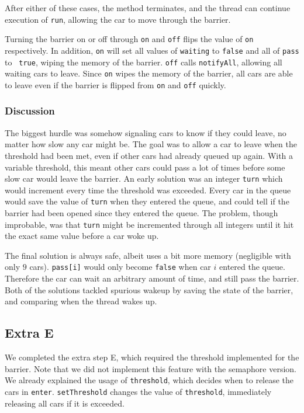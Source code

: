 After either of these cases, the method terminates, and the thread can continue execution of \texttt{run}, allowing the car to move through the barrier.

Turning the barrier on or off through \texttt{on} and \texttt{off} flips the value of \texttt{on} respectively. In addition, \texttt{on} will set all values of \texttt{waiting} to \texttt{false} and all of \texttt{pass} to \texttt{ true}, wiping the memory of the barrier. \texttt{off} calls \texttt{notifyAll}, allowing all waiting cars to leave. Since \texttt{on} wipes the memory of the barrier, all cars are able to leave even if the barrier is flipped from \texttt{on} and \texttt{off} quickly.

\subsubsection{Discussion}
The biggest hurdle was somehow signaling cars to know if they could leave, no matter how slow any car might be. The goal was to allow a car to leave when the threshold had been met, even if other cars had already queued up again. With a variable threshold, this meant other cars could pass a lot of times before some slow car would leave the barrier. An early solution was an integer \texttt{turn} which would increment every time the threshold was exceeded. Every car in the queue would save the value of \texttt{turn} when they entered the queue, and could tell if the barrier had been opened since they entered the queue. The problem, though improbable, was that \texttt{turn} might be incremented through all integers until it hit the exact same value before a car woke up.

The final solution is always safe, albeit uses a bit more memory (negligible with only $9$ cars). \texttt{pass[i]} would only become \texttt{false} when car $i$ entered the queue. Therefore the car can wait an arbitrary amount of time, and still pass the barrier. Both of the solutions tackled spurious wakeup by saving the state of the barrier, and comparing when the thread wakes up.

\subsection{Extra E}
We completed the extra step E, which required the threshold implemented for the barrier. Note that we did not implement this feature with the semaphore version. We already explained the usage of \texttt{threshold}, which decides when to release the cars in \texttt{enter}. \texttt{setThreshold} changes the value of \texttt{threshold}, immediately releasing all cars if it is exceeded.

